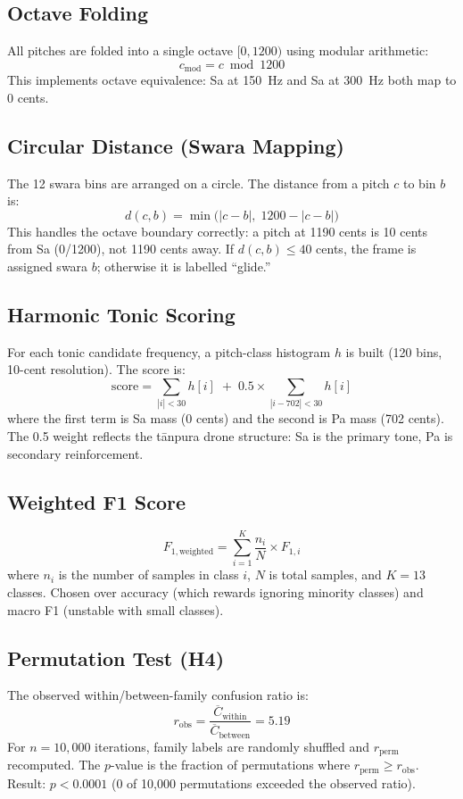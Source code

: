 \documentclass[11pt,a4paper]{article}
\begin{document}
\subsection{Octave Folding}

All pitches are folded into a single octave $[0, 1200)$ using modular arithmetic:
\[
c_{\text{mod}} = c \bmod 1200
\]
This implements octave equivalence: Sa at 150~Hz and Sa at 300~Hz both map to 0 cents.

\subsection{Circular Distance (Swara Mapping)}

The 12 swara bins are arranged on a circle. The distance from a pitch $c$ to bin $b$ is:
\[
d(c, b) = \min\!\big(|c - b|,\; 1200 - |c - b|\big)
\]
This handles the octave boundary correctly: a pitch at 1190 cents is 10 cents from Sa (0/1200), not 1190 cents away. If $d(c, b) \leq 40$ cents, the frame is assigned swara $b$; otherwise it is labelled ``glide.''

\subsection{Harmonic Tonic Scoring}

For each tonic candidate frequency, a pitch-class histogram $h$ is built (120 bins, 10-cent resolution). The score is:
\[
\text{score} = \sum_{|i| < 30} h[i] \;+\; 0.5 \times \sum_{|i - 702| < 30} h[i]
\]
where the first term is Sa mass (0 cents) and the second is Pa mass (702 cents). The 0.5 weight reflects the t\=anpura drone structure: Sa is the primary tone, Pa is secondary reinforcement.

\subsection{Weighted F1 Score}

\[
F_{1,\text{weighted}} = \sum_{i=1}^{K} \frac{n_i}{N} \times F_{1,i}
\]
where $n_i$ is the number of samples in class $i$, $N$ is total samples, and $K = 13$ classes. Chosen over accuracy (which rewards ignoring minority classes) and macro F1 (unstable with small classes).

\subsection{Permutation Test (H4)}

The observed within/between-family confusion ratio is:
\[
r_{\text{obs}} = \frac{\overline{C}_{\text{within}}}{\overline{C}_{\text{between}}} = 5.19
\]
For $n = 10{,}000$ iterations, family labels are randomly shuffled and $r_{\text{perm}}$ recomputed. The $p$-value is the fraction of permutations where $r_{\text{perm}} \geq r_{\text{obs}}$. Result: $p < 0.0001$ (0 of 10,000 permutations exceeded the observed ratio).
\end{document}
